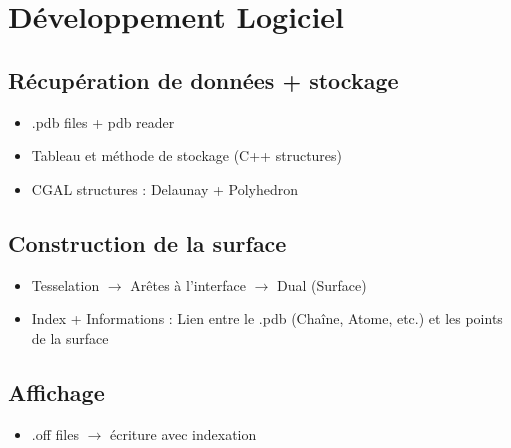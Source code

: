 \chapter{Développement Logiciel}

\section{Récupération de données + stockage}
\begin{itemize}
  \item .pdb files + pdb reader
  \item Tableau et méthode de stockage (C++ structures)
  \item CGAL structures : Delaunay + Polyhedron
\end{itemize}

\section{Construction de la surface}
\begin{itemize}
  \item Tesselation $\to$ Arêtes à l'interface $\to$ Dual (Surface)
  \item Index + Informations : Lien entre le .pdb (Chaîne, Atome, etc.) et les points de la surface
\end{itemize}

\section{Affichage}
\begin{itemize}
  \item .off files $\to$ écriture avec indexation
\end{itemize}
